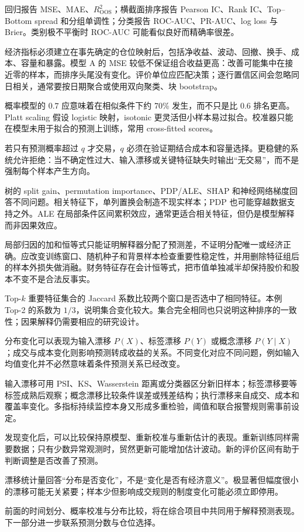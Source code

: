 回归报告 MSE、MAE、$R^2_{\mathrm{OOS}}$；横截面排序报告 Pearson IC、Rank IC、Top--Bottom spread 和分组单调性；分类报告 ROC-AUC、PR-AUC、log loss 与 Brier。类别极不平衡时 ROC-AUC 可能看似良好而精确率很差。



经济指标必须建立在事先确定的仓位映射后，包括净收益、波动、回撤、换手、成本、容量和暴露。模型 A 的 MSE 较低不保证组合收益更高：改善可能集中在接近零的样本，而排序头尾没有变化。评价单位应匹配决策；逐行置信区间会忽略同日相关，通常要按日期聚合或使用双向聚类、块 bootstrap。


概率模型的 $0.7$ 应意味着在相似条件下约 70\% 发生，而不只是比 $0.6$ 排名更高。Platt scaling 假设 logistic 映射，isotonic 更灵活但小样本易过拟合。校准器只能在模型未用于拟合的预测上训练，常用 cross-fitted scores。

若只有预测概率超过 $q$ 才交易，$q$ 必须在验证期结合成本和容量选择。更稳健的系统允许拒绝：当不确定性过大、输入漂移或关键特征缺失时输出“无交易”，而不是强制每个样本产生方向。


树的 split gain、permutation importance、PDP/ALE、SHAP 和神经网络梯度回答不同问题。相关特征下，单列置换会制造不现实样本；PDP 也可能穿越数据支持之外。ALE 在局部条件区间累积效应，通常更适合相关特征，但仍是模型解释而非因果效应。

局部归因的加和恒等式只能证明解释器分配了预测差，不证明分配唯一或经济正确。应改变训练窗口、随机种子和背景样本检查重要性稳定性，并用删除特征组后的样本外损失做消融。财务特征存在会计恒等式，把市值单独减半却保持股价和股本不变不是合法反事实。


Top-$k$ 重要特征集合的 Jaccard 系数比较两个窗口是否选中了相同特征。本例 Top-2 的系数为 $1/3$，说明集合变化较大。集合完全相同也只说明这种排序的一致性；因果解释仍需要相应的研究设计。

分布变化可以表现为输入漂移 $P(X)$、标签漂移 $P(Y)$ 或概念漂移 $P(Y\mid X)$；成交与成本变化则影响预测转成收益的关系。不同变化对应不同问题，例如输入均值变化并不必然意味着条件预测关系已经改变。

输入漂移可用 PSI、KS、Wasserstein 距离或分类器区分新旧样本；标签漂移要等标签成熟后观察；概念漂移比较条件误差或残差结构；执行漂移来自成交、成本和覆盖率变化。多指标持续监控本身又形成多重检验，阈值和联合报警规则需事前设定。

发现变化后，可以比较保持原模型、重新校准与重新估计的表现。重新训练同样需要数据；只有少数异常观测时，贸然更新可能增加估计波动。新的评价区间有助于判断调整是否改善了预测。

\begin{heuristic}
漂移统计量回答“分布是否变化”，不是“变化是否有经济意义”。极显著但幅度很小的漂移可能无关紧要；样本少但影响成交规则的制度变化可能必须立即停用。
\end{heuristic}

前面的时间划分、概率校准与分布比较，将在综合项目中共同用于解释预测表现。下一部分进一步联系预测分数与仓位选择。
